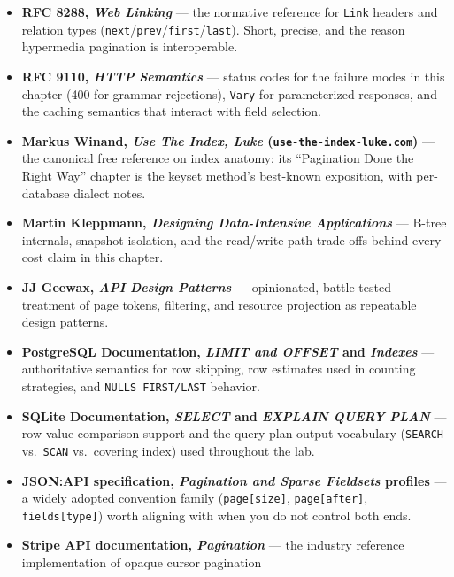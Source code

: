 \begin{itemize}
  \item \textbf{RFC 8288, \emph{Web Linking}} \cite{rfc8288} --- the
        normative reference for \texttt{Link} headers and relation types
        (\texttt{next}/\texttt{prev}/\texttt{first}/\texttt{last}). Short,
        precise, and the reason hypermedia pagination is interoperable.
  \item \textbf{RFC 9110, \emph{HTTP Semantics}} \cite{rfc9110} --- status
        codes for the failure modes in this chapter (400 for grammar
        rejections), \texttt{Vary} for parameterized responses, and the
        caching semantics that interact with field selection.
  \item \textbf{Markus Winand, \emph{Use The Index, Luke}
        (\texttt{use-the-index-luke.com})} --- the canonical free reference
        on index anatomy; its ``Pagination Done the Right Way'' chapter is
        the keyset method's best-known exposition, with per-database
        dialect notes.
  \item \textbf{Martin Kleppmann, \emph{Designing Data-Intensive
        Applications}} \cite{kleppmann2017ddia} --- B-tree internals,
        snapshot isolation, and the read/write-path trade-offs behind every
        cost claim in this chapter.
  \item \textbf{JJ Geewax, \emph{API Design Patterns}}
        \cite{gehl2021apidesign} --- opinionated, battle-tested treatment of
        page tokens, filtering, and resource projection as repeatable
        design patterns.
  \item \textbf{PostgreSQL Documentation, \emph{LIMIT and OFFSET} and
        \emph{Indexes}} --- authoritative semantics for row skipping, row
        estimates used in counting strategies, and \texttt{NULLS
        FIRST/LAST} behavior.
  \item \textbf{SQLite Documentation, \emph{SELECT} and \emph{EXPLAIN QUERY
        PLAN}} --- row-value comparison support and the query-plan output
        vocabulary (\texttt{SEARCH} vs.\ \texttt{SCAN} vs.\ covering index)
        used throughout the lab.
  \item \textbf{JSON:API specification, \emph{Pagination and Sparse
        Fieldsets} profiles} --- a widely adopted convention family
        (\texttt{page[size]}, \texttt{page[after]}, \texttt{fields[type]})
        worth aligning with when you do not control both ends.
  \item \textbf{Stripe API documentation, \emph{Pagination}} --- the
        industry reference implementation of opaque cursor pagination

\end{itemize}
